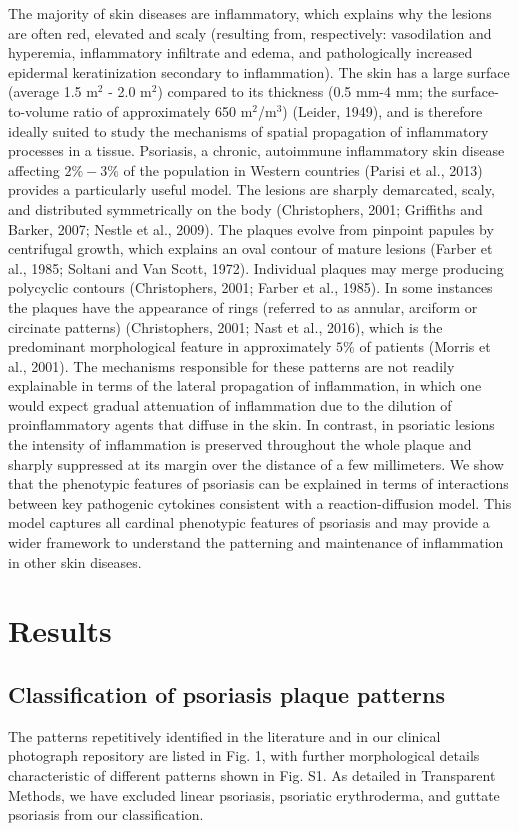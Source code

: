 The majority of skin diseases are inflammatory, which explains why the lesions are often red, elevated and scaly (resulting from, respectively: vasodilation and hyperemia, inflammatory infiltrate and edema, and pathologically increased epidermal keratinization secondary to inflammation). The skin has a large surface (average 1.5 m$^2$ - 2.0 m$^2$) compared to its thickness (0.5 mm-4 mm; the surface-to-volume ratio of approximately 650 m$^2$/m$^3$) (Leider, 1949), and is therefore ideally suited to study the mechanisms of spatial propagation of inflammatory processes in a tissue. Psoriasis, a chronic, autoimmune inflammatory skin disease affecting $2\%-3\%$ of the population in Western countries (Parisi et al., 2013) provides a particularly useful model. The lesions are sharply demarcated, scaly, and distributed symmetrically on the body (Christophers, 2001; Griffiths and Barker, 2007; Nestle et al., 2009). The plaques evolve from pinpoint papules by centrifugal growth, which explains an oval contour of mature lesions (Farber et al., 1985; Soltani and Van Scott, 1972). Individual plaques may merge producing polycyclic contours (Christophers, 2001; Farber et al., 1985). In some instances the plaques have the appearance of rings (referred to as annular, arciform or circinate patterns) (Christophers, 2001; Nast et al., 2016), which is the predominant morphological feature in approximately $5\%$ of patients (Morris et al., 2001). The mechanisms responsible for these patterns are not readily explainable in terms of the lateral propagation of inflammation, in which one would expect gradual attenuation of inflammation due to the dilution of proinflammatory agents that diffuse in the skin. In contrast, in psoriatic lesions the intensity of inflammation is preserved throughout the whole plaque and sharply suppressed at its margin over the distance of a few millimeters. We show that the phenotypic features of psoriasis can be explained in terms of interactions between key pathogenic cytokines consistent with a reaction-diffusion model. This model captures all cardinal phenotypic features of psoriasis and may provide a wider framework to understand the patterning and maintenance of inflammation in other skin diseases. 

\section{Results}
\subsection{Classification of psoriasis plaque patterns}
The patterns repetitively identified in the literature and in our clinical photograph repository are listed in Fig. 1, with further morphological details characteristic of different patterns shown in Fig. S1. As detailed in Transparent Methods, we have excluded linear psoriasis, psoriatic erythroderma, and guttate psoriasis from our classification. 


